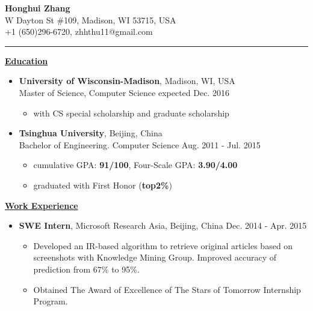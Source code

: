 \documentclass[11pt]{article}
\begin{document}
\begin{CJK}{GBK}{kai}
\begin{center}
  {\textbf{\huge Honghui Zhang}}\\ W Dayton St \#109, Madison, WI 53715, USA\\
  +1 (650)296-6720, zhhthu11@gmail.com\\
\end{center}
\rule[4pt]{16.5cm}{0.5pt}
{ \textbf{\underline{Education}}}\\\medskip
\begin{itemize}
  \item \textbf{University of Wisconsin-Madison}, Madison, WI, USA\\
  Master of Science, Computer Science  \hfill expected Dec. 2016\\
    \begin{itemize}
    \item with CS special scholarship and graduate scholarship\\\medskip
    \end{itemize}
 \item \textbf{Tsinghua University}, Beijing, China\\
 Bachelor of Engineering. Computer Science \hfill Aug. 2011 - Jul. 2015\\
    \begin{itemize}
    \item cumulative GPA: \textbf{91/100}, Four-Scale GPA: \textbf{3.90/4.00}
    \item graduated with First Honor (\textbf{top2\%})
    \end{itemize}
\end{itemize}

\bigskip

{ \textbf{\underline{Work Experience}}}\\\medskip

\begin{itemize}
   \item \textbf{SWE Intern}, Microsoft Research Asia, Beijing, China \hfill Dec. 2014 - Apr. 2015\\
     \begin{itemize}
     \item Developed an IR-based algorithm to retrieve original articles based on screenshots with Knowledge Mining Group. Improved accuracy of prediction from 67\% to 95\%.
     \item Obtained The Award of Excellence of The Stars of Tomorrow Internship Program.\\\medskip
     \end{itemize}


\end{itemize}
\end{CJK}
\end{document}
